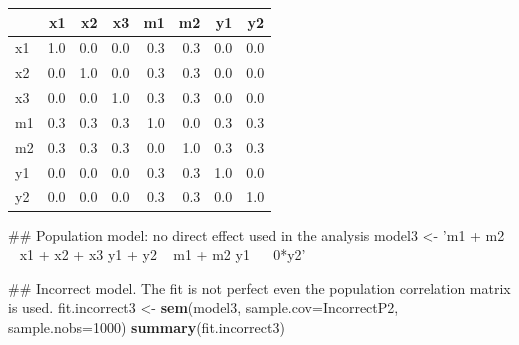 \documentclass[]{article}
\newenvironment{Shaded}{\begin{snugshade}}{\end{snugshade}}
\newcommand{\KeywordTok}[1]{\textcolor[rgb]{0.13,0.29,0.53}{\textbf{#1}}}
\newcommand{\DataTypeTok}[1]{\textcolor[rgb]{0.13,0.29,0.53}{#1}}
\newcommand{\DecValTok}[1]{\textcolor[rgb]{0.00,0.00,0.81}{#1}}
\newcommand{\StringTok}[1]{\textcolor[rgb]{0.31,0.60,0.02}{#1}}
\newcommand{\NormalTok}[1]{#1}
\begin{document}
\begin{longtable}[]{@{}lrrrrrrr@{}}
\toprule
& x1 & x2 & x3 & m1 & m2 & y1 & y2\tabularnewline
\midrule
\endhead
x1 & 1.0 & 0.0 & 0.0 & 0.3 & 0.3 & 0.0 & 0.0\tabularnewline
x2 & 0.0 & 1.0 & 0.0 & 0.3 & 0.3 & 0.0 & 0.0\tabularnewline
x3 & 0.0 & 0.0 & 1.0 & 0.3 & 0.3 & 0.0 & 0.0\tabularnewline
m1 & 0.3 & 0.3 & 0.3 & 1.0 & 0.0 & 0.3 & 0.3\tabularnewline
m2 & 0.3 & 0.3 & 0.3 & 0.0 & 1.0 & 0.3 & 0.3\tabularnewline
y1 & 0.0 & 0.0 & 0.0 & 0.3 & 0.3 & 1.0 & 0.0\tabularnewline
y2 & 0.0 & 0.0 & 0.0 & 0.3 & 0.3 & 0.0 & 1.0\tabularnewline
\bottomrule
\end{longtable}

\begin{Shaded}
\begin{Highlighting}[]
\NormalTok{## Population model: no direct effect used in the analysis}
\NormalTok{model3 <-}\StringTok{ 'm1 + m2 ~ x1 + x2 + x3}
\StringTok{           y1 + y2 ~ m1 + m2}
\StringTok{           y1 ~~ 0*y2'}

\NormalTok{## Incorrect model. The fit is not perfect even the population correlation matrix is used.}
\NormalTok{fit.incorrect3 <-}\StringTok{ }\KeywordTok{sem}\NormalTok{(model3, }\DataTypeTok{sample.cov=}\NormalTok{IncorrectP2, }\DataTypeTok{sample.nobs=}\DecValTok{1000}\NormalTok{)}
\KeywordTok{summary}\NormalTok{(fit.incorrect3)  }
\end{Highlighting}
\end{Shaded}
\end{document}
